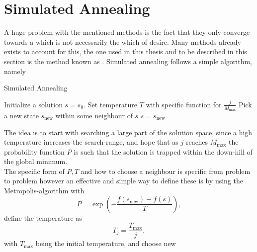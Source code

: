 \section{Simulated Annealing\label{sec:simulated_annealing}}
    A huge problem with the mentioned methods is the fact that they only
    converge towards a  which is not necessarily the
     which of desire. Many methods already exists to
    account for this, the one used in this thesis and to be described in this
    section is the method known as . Simulated
    annealing follows a simple algorithm, namely
        \begin{algorithm}[H]
            \caption{Simulated Annealing\label{alg:simulated_annealing}}
            \begin{algorithmic}[H]
                \State Initialize a solution $s=s_0$. 
                    \State Set temperature $T$ with specific function for
                    $\frac{j}{M_{\text{max}}}$
                    \State Pick a new state $s_{\text{new}}$ within some
                    neighbour of $s$
                        \State $s = s_{\text{new}}$
                    \EndIf
                \EndFor
            \end{algorithmic}
        \end{algorithm}
    The idea is to start with searching a large part of the solution space,
    since a high temperature increases the search-range, and hope that as $j$
    reaches $M_{\text{max}}$ the probability function $P$ is such that the
    solution is trapped within the down-hill of the global minimum. \\ 
    The specific form of $P, T$ and how to choose a neighbour is specific from
    problem to problem however an effective and simple way to define these is
    by using the Metropolis-algorithm with
        \begin{equation}
            P = \exp(-\frac{f(s_{\text{new}}) - f(s)}{T}),
        \end{equation}
    define the temperature as
        \begin{equation}
            T_j = \frac{T_{\text{max}}}{j},
        \end{equation}
    with $T_{\text{max}}$ being the initial temperature, and choose new
